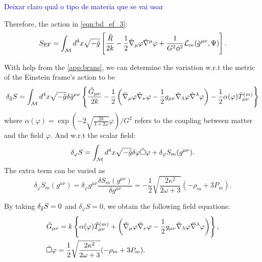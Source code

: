 \textcolor{blue}{Deixar claro qual o tipo de materia que se vai usar}

Therefore, the action in \cref{eqn:bd_ef_3}:
\begin{equation}
    S_{\text{EF}}=\int_{\mathcal{M}} d^4x\sqrt{-\Tilde{g}}\left[\frac{\Tilde{R}}{2k}-\frac{1}{2}\Tilde{\nabla}_\mu\varphi\Tilde{\nabla}^\mu\varphi+\frac{1}{G^2\phi^2}\mathcal{L}_m(\Tilde{g}^{\mu\nu},\Psi)\right].
    \label{eqn:bd_ef_4}
\end{equation}

With help from the \cref{app:brans}, we can determine the variation w.r.t the metric of the Einstein frame's action to be
\begin{equation}
    \delta_{\Tilde{g}} S = \int_{\mathcal{M}} d^4x\sqrt{-\Tilde{g}} \delta \Tilde{g}^{\mu\nu}\left\{\frac{\Tilde{G}_{\mu\nu}}{2k}-\frac{1}{2}\left(\Tilde{\nabla}_\mu\varphi\Tilde{\nabla}_\nu\varphi-\frac{1}{2}g_{\mu\nu}\Tilde{\nabla}_\lambda\varphi\Tilde{\nabla}^\lambda\varphi\right)-\frac{1}{2}\alpha(\varphi)\Tilde{T}_{\mu\nu}^{(m)}\right\}
\end{equation}
where $\alpha(\varphi)=\exp\left(-2\sqrt{\frac{2k}{3+2\omega}}\varphi\right)/G^2$ refers to the coupling between matter and the field $\varphi$. And w.r.t the scalar field:
\begin{equation}
    \delta_\varphi S=  \int_{\mathcal{M}} d^4x\sqrt{-\Tilde{g}}\delta\varphi \Tilde{\Box}\varphi +\delta_\varphi S_m(g^{\mu\nu}).
\end{equation}
The extra term can be varied as
\begin{equation}
    \delta_\varphi S_m(g^{\mu\nu})=\delta_{\varphi} g^{\mu\nu} \frac{\delta S_m(g^{\mu\nu})}{\delta g^{\mu\nu}}=-\frac{1}{2}\sqrt{\frac{2\kappa^2}{2\omega+3}}(-\rho_m+3P_m).
\end{equation}

By taking $\delta_{\Tilde{g}} S=0$ and $\delta_\varphi S=0$, we obtain the following field equations:
\begin{align}
    &\Tilde{G}_{\mu\nu}=k\left\{ \alpha(\varphi)\Tilde{T}_{\mu\nu}^{(m)} + \left(\Tilde{\nabla}_\mu\varphi\Tilde{\nabla}_\nu\varphi-\frac{1}{2}g_{\mu\nu}\Tilde{\nabla}_\lambda\varphi\Tilde{\nabla}^\lambda\varphi\right) \right\},\label{eqn:field_metric_ef}\\
    &\Tilde{\Box}\varphi=\frac{1}{2}\sqrt{\frac{2\kappa^2}{2\omega+3}}(-\rho_m+3P_m).\label{eqn:field_scalar_ef}
\end{align}



